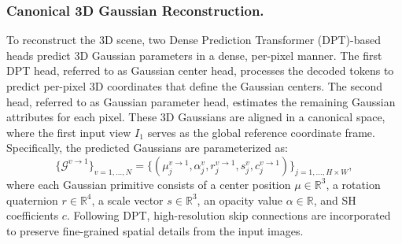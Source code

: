 \documentclass[runningheads]{llncs}
\begin{document}
\subsubsection{Canonical 3D Gaussian Reconstruction.}
To reconstruct the 3D scene, two Dense Prediction Transformer (DPT)-based heads \cite{ranftl2021dpt} predict 3D Gaussian parameters in a dense, per-pixel manner. The first DPT head, referred to as Gaussian center head, processes the decoded tokens to predict per-pixel 3D coordinates that define the Gaussian centers. The second head, referred to as Gaussian parameter head, estimates the remaining Gaussian attributes for each pixel. These 3D Gaussians are aligned in a canonical space, where the first input view $I_1$ serves as the global reference coordinate frame. Specifically, the predicted Gaussians are parameterized as:
\begin{equation}
    \{\mathcal{G}^{v \to 1}\}_{v=1, \dots, N} = \{ (\mu_j^{v \to 1}, \alpha_j^v, r_j^{v \to 1}, s_j^v, c_j^{v \to 1}) \}_{j=1, \dots, H \times W},
    \label{eq:gaussianparams}
\end{equation}
where each Gaussian primitive consists of a center position $\mu \in \mathbb{R}^3$, a rotation quaternion $r \in \mathbb{R}^4$, a scale vector $s \in \mathbb{R}^3$, an opacity value $\alpha \in \mathbb{R}$, and SH coefficients $c$. Following DPT, high-resolution skip connections are incorporated to preserve fine-grained spatial details from the input images.
\end{document}

